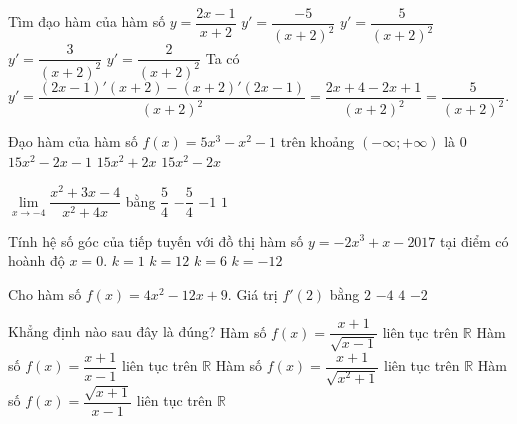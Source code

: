 \begin{ex}%
	Tìm đạo hàm của hàm số $y=\dfrac{2x-1}{x+2}$
	\choice
	{$y'=\dfrac{-5}{(x+2)^2}$}
	{\True $y'=\dfrac{5}{(x+2)^2}$}
	{$y'=\dfrac{3}{(x+2)^2}$}
	{$y'=\dfrac{2}{(x+2)^2}$}
	\loigiai
	{
		Ta có $y'=\dfrac{(2x-1)'(x+2)-(x+2)'(2x-1)}{(x+2)^2}=\dfrac{2x+4-2x+1}{(x+2)^2}=\dfrac{5}{(x+2)^2}.$
	}
\end{ex}

\begin{ex}%
Đạo hàm của hàm số $f(x)=5x^3-x^2-1$ trên khoảng $(-\infty;+\infty)$ là
\choice
{$0$}
{$15x^2-2x-1$}
{$15x^2+2x$}
{\True $15x^2-2x$}
\end{ex}

\begin{ex}%
$\lim\limits_{x\to -4}\dfrac{x^2+3x-4}{x^2+4x}$ bằng
\choice
{\True $\dfrac{5}{4}$}
{$-\dfrac{5}{4}$}
{$-1$}
{$1$}
\end{ex}

\begin{ex}%
Tính hệ số góc của tiếp tuyến với đồ thị hàm số $y=-2x^3+x-2017$ tại điểm có hoành độ $x=0$.
\choice
{\True $k=1$}
{$k=12$}
{$k=6$}
{$k=-12$}
\end{ex}

\begin{ex}%
Cho hàm số $f(x)=4x^2-12x+9$. Giá trị $f'(2)$ bằng
\choice
{$2$}
{$-4$}
{\True $4$}
{$-2$}
\end{ex}

\begin{ex}%
Khẳng định nào sau đây là đúng?
\choice
{Hàm số $f(x)=\dfrac{x+1}{\sqrt{x-1}}$ liên tục trên $\mathbb{R}$}
{Hàm số $f(x)=\dfrac{x+1}{x-1}$ liên tục trên $\mathbb{R}$}
{\True Hàm số $f(x)=\dfrac{x+1}{\sqrt{x^2+1}}$ liên tục trên $\mathbb{R}$}
{Hàm số $f(x)=\dfrac{\sqrt{x+1}}{x-1}$ liên tục trên $\mathbb{R}$}
\end{ex}

